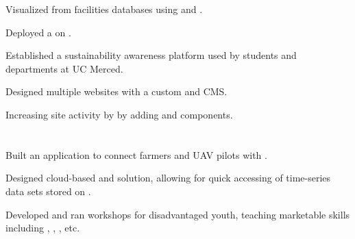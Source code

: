 \documentclass[]{hackathons}
\begin{document}
\begin{minipage}[t]{0.64\textwidth}
\begin{tightemize}
\item Visualized  from facilities databases using  and .
\item Deployed a  on .
\item Established a sustainability awareness platform used by  students and  departments at UC Merced.
\end{tightemize}
\medskip

\begin{tightemize}
\item Designed multiple websites with a custom  and  CMS.
\item Increasing site activity by  by adding  and  components.
\end{tightemize}
\small


\section{}
\begin{tightemize}
\item Built an application to connect farmers and UAV pilots with .
\item Designed cloud-based  and  solution, allowing for quick accessing of time-series data sets stored on .
\end{tightemize}
\medskip

\begin{tightemize}
\item Developed and ran workshops for disadvantaged youth, teaching marketable skills including , , , etc.
\end{tightemize}


%
%

\end{minipage} 
\end{document}
